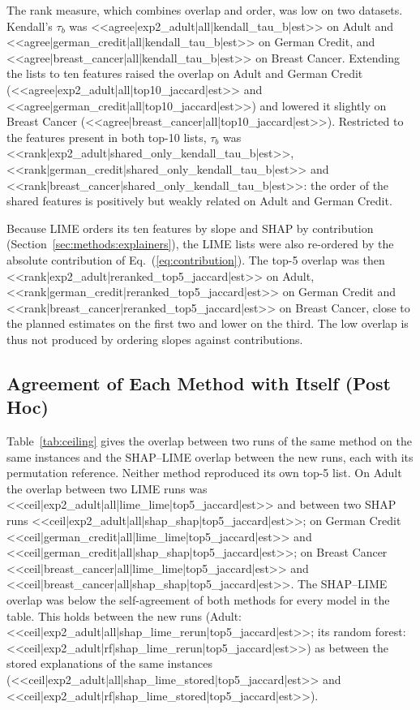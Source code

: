 \documentclass{cys}
\begin{document}
The rank measure, which combines overlap and order, was low on two datasets. Kendall's
$\tau_b$ was
<<agree|exp2_adult|all|kendall_tau_b|est>> on Adult and
<<agree|german_credit|all|kendall_tau_b|est>> on German Credit, and
<<agree|breast_cancer|all|kendall_tau_b|est>> on Breast Cancer. Extending the lists to
ten features raised the overlap on Adult and German Credit
(<<agree|exp2_adult|all|top10_jaccard|est>> and
<<agree|german_credit|all|top10_jaccard|est>>) and lowered it slightly on Breast Cancer
(<<agree|breast_cancer|all|top10_jaccard|est>>). Restricted to the features present in
both top-10 lists, $\tau_b$ was <<rank|exp2_adult|shared_only_kendall_tau_b|est>>,
<<rank|german_credit|shared_only_kendall_tau_b|est>> and
<<rank|breast_cancer|shared_only_kendall_tau_b|est>>: the order of the shared features is
positively but weakly related on Adult and German Credit.

Because LIME orders its ten features by slope and SHAP by contribution
(Section~\ref{sec:methods:explainers}), the LIME lists were also re-ordered by the absolute
contribution of Eq.~(\ref{eq:contribution}). The top-5 overlap was then
<<rank|exp2_adult|reranked_top5_jaccard|est>> on Adult,
<<rank|german_credit|reranked_top5_jaccard|est>> on German Credit and
<<rank|breast_cancer|reranked_top5_jaccard|est>> on Breast Cancer, close to the planned
estimates on the first two and lower on the third. The low overlap is thus not produced
by ordering slopes against contributions.

\subsection{Agreement of Each Method with Itself (Post Hoc)}
\label{sec:results:ceiling}

Table~\ref{tab:ceiling} gives the overlap between two runs of the same method on the same
instances and the SHAP--LIME overlap between the new runs, each with its permutation
reference. Neither method reproduced its own top-5 list. On Adult the overlap between two LIME runs
was <<ceil|exp2_adult|all|lime_lime|top5_jaccard|est>> and between two SHAP runs
<<ceil|exp2_adult|all|shap_shap|top5_jaccard|est>>; on German Credit
<<ceil|german_credit|all|lime_lime|top5_jaccard|est>> and
<<ceil|german_credit|all|shap_shap|top5_jaccard|est>>; on Breast Cancer
<<ceil|breast_cancer|all|lime_lime|top5_jaccard|est>> and
<<ceil|breast_cancer|all|shap_shap|top5_jaccard|est>>. The SHAP--LIME overlap was below
the self-agreement of both methods for every model in the table. This holds between the
new runs (Adult: <<ceil|exp2_adult|all|shap_lime_rerun|top5_jaccard|est>>; its random forest: <<ceil|exp2_adult|rf|shap_lime_rerun|top5_jaccard|est>>)
as between the stored explanations of the same instances (<<ceil|exp2_adult|all|shap_lime_stored|top5_jaccard|est>> and
<<ceil|exp2_adult|rf|shap_lime_stored|top5_jaccard|est>>).
\end{document}
